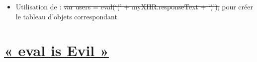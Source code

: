 \begin{english}

\begin{Shaded}
\begin{Highlighting}[]
\FunctionTok{\{}\FunctionTok{:} \FunctionTok{,} \FunctionTok{:} \FunctionTok{\}}
\end{Highlighting}
\end{Shaded}

\end{english}

\begin{english}

\begin{Shaded}
\begin{Highlighting}[]
\OtherTok{[}\OtherTok{,} \OtherTok{,} \OtherTok{,} \OtherTok{]}
\end{Highlighting}
\end{Shaded}

\end{english}

\begin{english}

\begin{Shaded}
\begin{Highlighting}[]
\OtherTok{[}
  \FunctionTok{\{}\FunctionTok{:} \FunctionTok{,} \FunctionTok{:} \FunctionTok{\}}\OtherTok{,}
  \FunctionTok{\{}\FunctionTok{:} \FunctionTok{,}  \FunctionTok{:} \FunctionTok{\}}\OtherTok{,}
  \FunctionTok{\{}\FunctionTok{:} \FunctionTok{,}    \FunctionTok{:} \FunctionTok{\}}
\OtherTok{]}
\end{Highlighting}
\end{Shaded}

\end{english}

\begin{itemize}
\tightlist
\item
  Utilisation de : \sout{var users = eval(`(' + myXHR.responseText +
  `)');} pour créer le tableau d'objets correspondant
\end{itemize}

\hypertarget{eval-is-evil-22}{%
\section{\texorpdfstring{\href{https://javascriptweblog.wordpress.com/2010/04/19/how-evil-is-eval/}{«
eval is Evil »}}{« eval is Evil »}}\label{eval-is-evil-22}}

